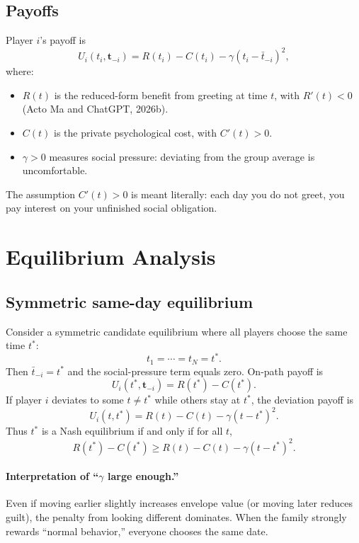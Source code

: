 \documentclass[AER]{AEA}
\begin{document}
\subsection{Payoffs}
Player $i$'s payoff is
\begin{equation}
U_i(t_i,\mathbf t_{-i})=R(t_i)-C(t_i)-\gamma (t_i-\bar t_{-i})^2 ,
\label{eq:payoff}
\end{equation}
where:

\begin{itemize}
\item $R(t)$ is the reduced-form benefit from greeting at time $t$, with $R'(t)<0$ (Acto Ma and ChatGPT, 2026b).
\item $C(t)$ is the private psychological cost, with $C'(t)>0$.
\item $\gamma>0$ measures social pressure: deviating from the group average is uncomfortable.
\end{itemize}

The assumption $C'(t)>0$ is meant literally: each day you do not greet, you pay interest on your unfinished social obligation.

\section{Equilibrium Analysis}

\subsection{Symmetric same-day equilibrium}
Consider a symmetric candidate equilibrium where all players choose the same time $t^*$:
\[
t_1=\cdots=t_N=t^* .
\]
Then $\bar t_{-i}=t^*$ and the social-pressure term equals zero. On-path payoff is
\[
U_i(t^*,\mathbf t_{-i})=R(t^*)-C(t^*) .
\]
If player $i$ deviates to some $t\ne t^*$ while others stay at $t^*$, the deviation payoff is
\[
U_i(t,t^*)=R(t)-C(t)-\gamma (t-t^*)^2 .
\]
Thus $t^*$ is a Nash equilibrium if and only if for all $t$,
\begin{equation}
R(t^*)-C(t^*) \ge R(t)-C(t)-\gamma (t-t^*)^2 .
\label{eq:NEcondition}
\end{equation}

\paragraph{Interpretation of ``$\gamma$ large enough.''}
Even if moving earlier slightly increases envelope value (or moving later reduces guilt), the penalty from looking different dominates. When the family strongly rewards ``normal behavior,'' everyone chooses the same date.
\end{document}
